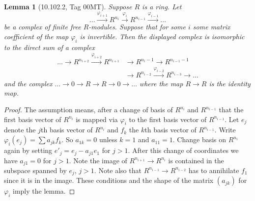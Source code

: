 \documentclass[UTF8,11pt]{ctexart}
\newtheorem*{lemma}{Lemma}
\begin{document}
\begin{lemma}[10.102.2, Tag 00MT]
Suppose $R$ is a ring. Let
\[
\ldots\xrightarrow{\varphi_{i+1}}R^{n_i}\xrightarrow{\varphi_i}R^{n_{i-1}}
\xrightarrow{\varphi_{i-1}}\ldots
\]
be a complex of finite free $R$-modules. Suppose that for some $i$ some matrix coefficient of the map $\varphi_i$ is invertible. Then the displayed complex is isomorphic to the direct sum of a complex
\[
\begin{aligned}
\ldots\to R^{n_{i+2}}\xrightarrow{\varphi_{i+2}}R^{n_{i+1}}
&\to R^{n_i-1}\to R^{n_{i-1}-1}\\
&\to R^{n_{i-2}}\xrightarrow{\varphi_{i-2}}R^{n_{i-3}}\to\ldots
\end{aligned}
\]
and the complex $\ldots\to0\to R\to R\to0\to\ldots$ where the map $R\to R$ is the identity map.
\end{lemma}
\begin{proof}
The assumption means, after a change of basis of $R^{n_i}$ and $R^{n_{i-1}}$ that the first basis vector of $R^{n_i}$ is mapped via $\varphi_i$ to the first basis vector of $R^{n_{i-1}}$. Let $e_j$ denote the $j$th basis vector of $R^{n_i}$ and $f_k$ the $k$th basis vector of $R^{n_{i-1}}$. Write $\varphi_i(e_j)=\sum a_{jk}f_k$. So $a_{1k}=0$ unless $k=1$ and $a_{11}=1$. Change basis on $R^{n_i}$ again by setting $e'_j=e_j-a_{j1}e_1$ for $j>1$. After this change of coordinates we have $a_{j1}=0$ for $j>1$. Note the image of $R^{n_{i+1}}\to R^{n_i}$ is contained in the subspace spanned by $e_j$, $j>1$. Note also that $R^{n_{i-1}}\to R^{n_{i-2}}$ has to annihilate $f_1$ since it is in the image. These conditions and the shape of the matrix $(a_{jk})$ for $\varphi_i$ imply the lemma.
\end{proof}
\end{document}
